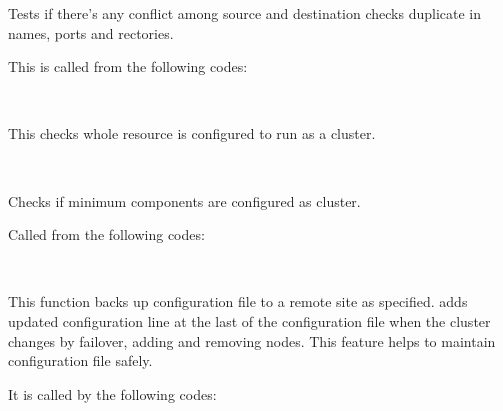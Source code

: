   
      Tests if there's any conflict among source and destination checks duplicate in names, ports and rectories.
      
      This is called from the following codes:
      
      \FuncRefHdr
		  \\ \hline
      \FuncRefTrailor
  
  
      This checks whole \XC{} resource is configured to run as a cluster.
      
      \FuncRefHdr
		  \\ \hline
      \FuncRefTrailor
  
  
      Checks if minimum components are configured as \XC{} cluster.
      
      Called from the following codes:
      
      \FuncRefHdr
		  \\ \hline
      \FuncRefTrailor
  
  
      This function backs up configuration file to a remote site as specified.
       adds updated configuration line at the last of the configuration file when
      the cluster changes by failover, adding and removing nodes.
      This feature helps to maintain  configuration file safely.
      
      It is called by the following codes:
      
